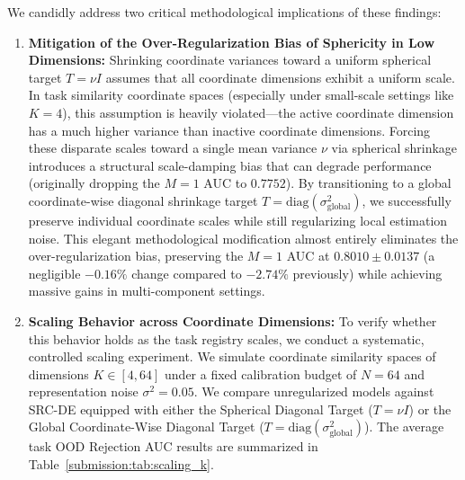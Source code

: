 We candidly address two critical methodological implications of these findings:
\begin{enumerate}
    \item {\bf Mitigation of the Over-Regularization Bias of Sphericity in Low Dimensions:} Shrinking coordinate variances toward a uniform spherical target $T = \nu I$ assumes that all coordinate dimensions exhibit a uniform scale. In task similarity coordinate spaces (especially under small-scale settings like $K=4$), this assumption is heavily violated—the active coordinate dimension has a much higher variance than inactive coordinate dimensions. Forcing these disparate scales toward a single mean variance $\nu$ via spherical shrinkage introduces a structural scale-damping bias that can degrade performance (originally dropping the $M=1$ AUC to $0.7752$). By transitioning to a global coordinate-wise diagonal shrinkage target $T = \text{diag}(\sigma^2_{\text{global}})$, we successfully preserve individual coordinate scales while still regularizing local estimation noise. This elegant methodological modification almost entirely eliminates the over-regularization bias, preserving the $M=1$ AUC at {\bf $0.8010 \pm 0.0137$} (a negligible $-0.16\%$ change compared to $-2.74\%$ previously) while achieving massive gains in multi-component settings.
    \item {\bf Scaling Behavior across Coordinate Dimensions:} To verify whether this behavior holds as the task registry scales, we conduct a systematic, controlled scaling experiment. We simulate coordinate similarity spaces of dimensions $K \in [4, 64]$ under a fixed calibration budget of $N=64$ and representation noise $\sigma^2=0.05$. We compare unregularized models against SRC-DE equipped with either the Spherical Diagonal Target ($T = \nu I$) or the Global Coordinate-Wise Diagonal Target ($T = \text{diag}(\sigma^2_{\text{global}})$). The average task OOD Rejection AUC results are summarized in Table~\ref{submission:tab:scaling_k}.
\end{enumerate}

